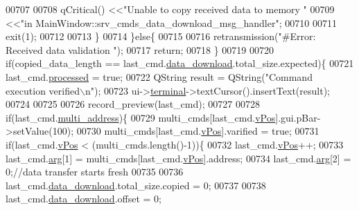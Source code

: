 \begin{DoxyCode}
{{00707                    
00708                    qCritical() <<\textcolor{stringliteral}{"Unable to copy received data to memory "}
00709                                <<\textcolor{stringliteral}{"in MainWindow::srv\_cmds\_data\_download\_msg\_handler"};
00710                 
00711                    exit(1);
00712                    
00713                   \}
00714                \}\textcolor{keywordflow}{else}\{
00715                    
00716                   retransmission(\textcolor{stringliteral}{"#Error: Received data  validation "});
00717                   \textcolor{keywordflow}{return};
00718                \}
00719                
00720                \textcolor{keywordflow}{if}(copied\_data\_length == last\_cmd.\hyperlink{a00001_a5cfeaed4d4f8e51070a324c0ba893ebe}{data\_download}.total\_size.expected)\{
00721                    last\_cmd.\hyperlink{a00001_a3e88f779da9798a5da7dda227e2ca388}{processed} = \textcolor{keyword}{true};
00722                    QString result =  QString(\textcolor{stringliteral}{"Command execution verified\(\backslash\)n"});
00723                    ui->\hyperlink{a00027_aae71c46ea4546df5994735dee573b2dd}{terminal}->textCursor().insertText(result);
00724 
00725                    
00726                    record\_preview(last\_cmd);
00727                    
00728                    \textcolor{keywordflow}{if}(last\_cmd.\hyperlink{a00001_a8e69b971c61ced27a7567efd2bf0db59}{multi\_address})\{
00729                         multi\_cmds[last\_cmd.\hyperlink{a00001_a2b48b371fd84be2a8ad581b1ad708b88}{vPos}].gui.pBar->setValue(100);
00730                         multi\_cmds[last\_cmd.\hyperlink{a00001_a2b48b371fd84be2a8ad581b1ad708b88}{vPos}].varified = \textcolor{keyword}{true};
00731                     \textcolor{keywordflow}{if}(last\_cmd.\hyperlink{a00001_a2b48b371fd84be2a8ad581b1ad708b88}{vPos} < (multi\_cmds.length()-1))\{
00732                        last\_cmd.\hyperlink{a00001_a2b48b371fd84be2a8ad581b1ad708b88}{vPos}++;
00733                        last\_cmd.\hyperlink{a00001_a56e6c2d7315d0ae60a51e8b140c9cfe4}{arg}[1] = multi\_cmds[last\_cmd.\hyperlink{a00001_a2b48b371fd84be2a8ad581b1ad708b88}{vPos}].address;
00734                        last\_cmd.\hyperlink{a00001_a56e6c2d7315d0ae60a51e8b140c9cfe4}{arg}[2] = 0;\textcolor{comment}{//data transfer starts fresh}
00735                        
00736                        last\_cmd.\hyperlink{a00001_a5cfeaed4d4f8e51070a324c0ba893ebe}{data\_download}.total\_size.copied     = 0;
00737                        
00738                        last\_cmd.\hyperlink{a00001_a5cfeaed4d4f8e51070a324c0ba893ebe}{data\_download}.offset                = 0;
}}
\end{DoxyCode}
